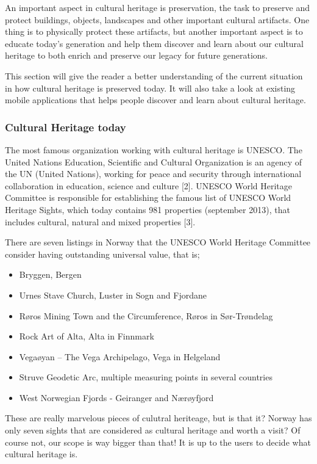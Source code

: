 \documentclass[11pt]{book}
\begin{document}
An important aspect in cultural heritage is preservation, the task to preserve and protect buildings, objects, landscapes and other important cultural artifacts. One thing is to physically protect these artifacts, but another important aspect is to educate today’s generation and help them discover and learn about our cultural heritage to both enrich and preserve our legacy for future generations.

This section will give the reader a better understanding of the current situation in how cultural heritage is preserved today. It will also take a look at existing mobile applications that helps people discover and learn about cultural heritage.

\subsubsection{Cultural Heritage today}
The most famous organization working with cultural heritage is UNESCO. The United Nations Education, Scientific and Cultural Organization is an agency of the UN (United Nations), working for peace and security through international collaboration in education, science and culture [2]. UNESCO World Heritage Committee is responsible for establishing  the famous list of UNESCO World Heritage Sights, which today contains 981 properties (september 2013), that includes cultural, natural and mixed properties [3]. 

There are seven listings in Norway that the UNESCO World Heritage Committee consider having outstanding universal value, that is;

\begin{itemize}
  \item Bryggen, Bergen
  \item Urnes Stave Church, Luster in Sogn and Fjordane
  \item Røros Mining Town and the Circumference, Røros in Sør-Trøndelag
  \item Rock Art of Alta, Alta in Finnmark
  \item Vegaøyan -- The Vega Archipelago, Vega in Helgeland
  \item Struve Geodetic Arc, multiple measuring points in several countries
  \item West Norwegian Fjords - Geiranger and Nærøyfjord
\end{itemize}

These are really marvelous pieces of culutral heriteage, but is that it? Norway has only seven sights that are considered as cultural heritage and worth a visit? Of course not, our scope is way bigger than that! It is up to the users to decide what cultural heritage is.
\end{document}
